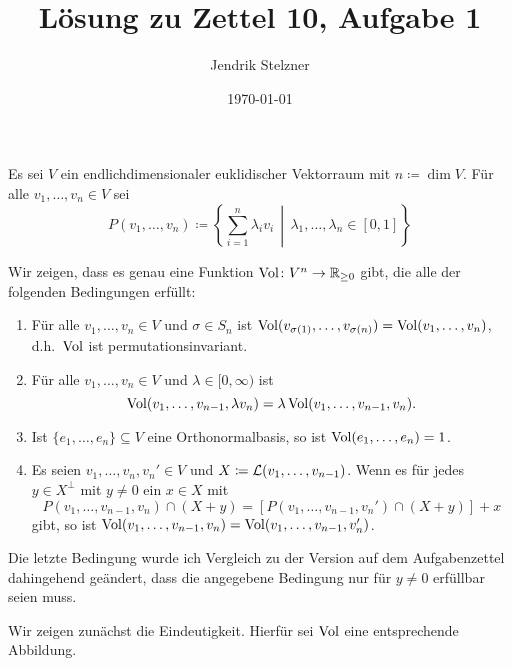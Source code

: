\documentclass[a4paper, 10pt]{scrartcl}
\title{Lösung zu Zettel 10, Aufgabe 1}
\author{Jendrik Stelzner}
\date{\today}
\begin{document}
\maketitle

Es sei $V$ ein endlichdimensionaler euklidischer Vektorraum mit $n \coloneqq \dim V$.
Für alle $v_1, \dotsc, v_n \in V$ sei
\[
            P(v_1, \dotsc, v_n)
  \coloneqq \left\{ \sum_{i=1}^n \lambda_i v_i \,\middle|\, \lambda_1, \dotsc, \lambda_n \in [0,1] \right\}
\]

Wir zeigen, dass es genau eine Funktion $\operatorname{Vol} \colon V^n \to \mathbb{R}_{\geq 0}$ gibt, die alle der folgenden Bedingungen erfüllt:
\begin{enumerate}
  \item\label{enum: permutationinvariant}
    Für alle $v_1, \dotsc, v_n \in V$ und $\sigma \in S_n$ ist $\operatorname{Vol}(v_{\sigma(1)}, \dotsc, v_{\sigma(n)}) = \operatorname{Vol}(v_1, \dotsc, v_n)$, d.h.\ $\operatorname{Vol}$ ist permutationsinvariant.
  \item\label{enum: homogeneous in the last coordinate}
    Für alle $v_1, \dotsc, v_n \in V$ und $\lambda \in [0,\infty)$ ist
    \[
        \operatorname{Vol}(v_1, \dotsc, v_{n-1}, \lambda v_n)
      = \lambda \operatorname{Vol}(v_1, \dotsc, v_{n-1}, v_n).
    \]
  \item\label{enum: normed}
    Ist $\{e_1, \dotsc, e_n\} \subseteq V$ eine Orthonormalbasis, so ist $\operatorname{Vol}(e_1, \dotsc, e_n) = 1$.
  \item\label{enum: Cavalieri property}
    Es seien $v_1, \dotsc, v_n, v_n' \in V$ und $X \coloneqq \operatorname{\mathcal{L}}(v_1, \dotsc, v_{n-1})$.
    Wenn es für jedes $y \in X^\perp$ mit $y \neq 0$ ein $x \in X$ mit
    \[
        P(v_1, \dotsc, v_{n-1}, v_n) \cap (X + y)
      = [P(v_1, \dotsc, v_{n-1}, v_n') \cap (X + y)] + x
    \]
    gibt, so ist $\operatorname{Vol}(v_1, \dotsc, v_{n-1}, v_n) = \operatorname{Vol}(v_1, \dotsc, v_{n-1}, v_n')$.
\end{enumerate}


\begin{remark}
  Die letzte Bedingung wurde ich Vergleich zu der Version auf dem Aufgabenzettel dahingehend geändert, dass die angegebene Bedingung nur für $y \neq 0$ erfüllbar seien muss.
\end{remark}


Wir zeigen zunächst die Eindeutigkeit.
Hierfür sei $\operatorname{Vol}$ eine entsprechende Abbildung.
\end{document}
